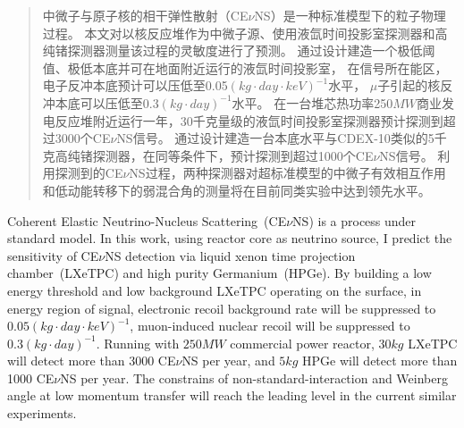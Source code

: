 

\begin{abstract}
  中微子与原子核的相干弹性散射（CE$\nu$NS）是一种标准模型下的粒子物理过程。
  本文对以核反应堆作为中微子源、使用液氙时间投影室探测器和高纯锗探测器测量该过程的灵敏度进行了预测。
  通过设计建造一个极低阈值、极低本底并可在地面附近运行的液氙时间投影室，
  在信号所在能区，电子反冲本底预计可以压低至0.05$\left(\si{kg}\cdot\si{day}\cdot\si{keV}\right)^{-1}$水平，
  $\mu$子引起的核反冲本底可以压低至0.3$\left(\si{kg}\cdot\si{day}\right)^{-1}$水平。
  在一台堆芯热功率250$\si{MW}$商业发电反应堆附近运行一年，30千克量级的液氙时间投影室探测器预计探测到超过3000个CE$\nu$NS信号。
  通过设计建造一台本底水平与CDEX-10类似的5千克高纯锗探测器，在同等条件下，预计探测到超过1000个CE$\nu$NS信号。
  利用探测到的CE$\nu$NS过程，两种探测器对超标准模型的中微子有效相互作用和低动能转移下的弱混合角的测量将在目前同类实验中达到领先水平。

\end{abstract}

\begin{abstract*}
  Coherent Elastic Neutrino-Nucleus Scattering~(CE$\nu$NS) is a process under standard model.
  In this work, using reactor core as neutrino source, 
  I predict the sensitivity of CE$\nu$NS detection via liquid xenon time projection chamber~(LXeTPC) and high purity Germanium~(HPGe).
  By building a low energy threshold and low background LXeTPC operating on the surface,
  in energy region of signal, electronic recoil background rate will be suppressed to $0.05\left(\si{kg}\cdot\si{day}\cdot\si{keV}\right)^{-1}$,
  muon-induced nuclear recoil will be suppressed to $0.3\left(\si{kg}\cdot\si{day}\right)^{-1}$. 
  Running with $250\si{MW}$ commercial power reactor, $30\si{kg}$ LXeTPC will detect more than 3000 CE$\nu$NS per year, 
  and $5\si{kg}$ HPGe will detect more than 1000 CE$\nu$NS per year. 
  The constrains of non-standard-interaction and Weinberg angle at low momentum transfer will reach the leading level in the current similar experiments.

\end{abstract*}

